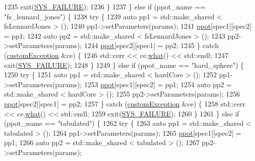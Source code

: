 \begin{DoxyCode}
1235             exit(\hyperlink{global_8h_a428dfe1ef0a6ff4b1fdebf275f6aff2e}{SYS\_FAILURE});
1236         \}
1237     \} \textcolor{keywordflow}{else} \textcolor{keywordflow}{if} (ppot\_name == \textcolor{stringliteral}{"fs\_lennard\_jones"}) \{
1238         \textcolor{keywordflow}{try} \{
1239             \textcolor{keyword}{auto} pp1 = std::make\_shared < fsLennardJones > ();
1240             pp1->setParameters(params);
1241             \hyperlink{classsim_system_ad2e290b5963f132e6a3a56cee35c8e9f}{ppot}[spec1][spec2] = pp1;
1242             \textcolor{keyword}{auto} pp2 = std::make\_shared < fsLennardJones > ();
1243             pp2->setParameters(params);
1244             \hyperlink{classsim_system_ad2e290b5963f132e6a3a56cee35c8e9f}{ppot}[spec2][spec1] = pp2;
1245         \} \textcolor{keywordflow}{catch} (\hyperlink{classcustom_exception}{customException} &ce) \{
1246             std::cerr << ce.\hyperlink{classcustom_exception_aeb6ab5848b038adfc68fde86a512f691}{what}() << std::endl;
1247             exit(\hyperlink{global_8h_a428dfe1ef0a6ff4b1fdebf275f6aff2e}{SYS\_FAILURE});
1248         \}
1249     \} \textcolor{keywordflow}{else} \textcolor{keywordflow}{if} (ppot\_name == \textcolor{stringliteral}{"hard\_sphere"}) \{
1250         \textcolor{keywordflow}{try} \{
1251             \textcolor{keyword}{auto} pp1 = std::make\_shared < hardCore > ();
1252             pp1->setParameters(params);
1253             \hyperlink{classsim_system_ad2e290b5963f132e6a3a56cee35c8e9f}{ppot}[spec1][spec2] = pp1;
1254             \textcolor{keyword}{auto} pp2 = std::make\_shared < hardCore > ();
1255             pp2->setParameters(params);
1256             \hyperlink{classsim_system_ad2e290b5963f132e6a3a56cee35c8e9f}{ppot}[spec2][spec1] = pp2;
1257         \} \textcolor{keywordflow}{catch} (\hyperlink{classcustom_exception}{customException} &ce) \{
1258             std::cerr << ce.\hyperlink{classcustom_exception_aeb6ab5848b038adfc68fde86a512f691}{what}() << std::endl;
1259             exit(\hyperlink{global_8h_a428dfe1ef0a6ff4b1fdebf275f6aff2e}{SYS\_FAILURE});
1260         \}
1261     \} \textcolor{keywordflow}{else} \textcolor{keywordflow}{if} (ppot\_name == \textcolor{stringliteral}{"tabulated"}) \{
1262         \textcolor{keywordflow}{try} \{
1263             \textcolor{keyword}{auto} pp1 = std::make\_shared < tabulated > ();
1264             pp1->setParameters(params);
1265             \hyperlink{classsim_system_ad2e290b5963f132e6a3a56cee35c8e9f}{ppot}[spec1][spec2] = pp1;
1266             \textcolor{keyword}{auto} pp2 = std::make\_shared < tabulated > ();
1267             pp2->setParameters(params);

\end{DoxyCode}
